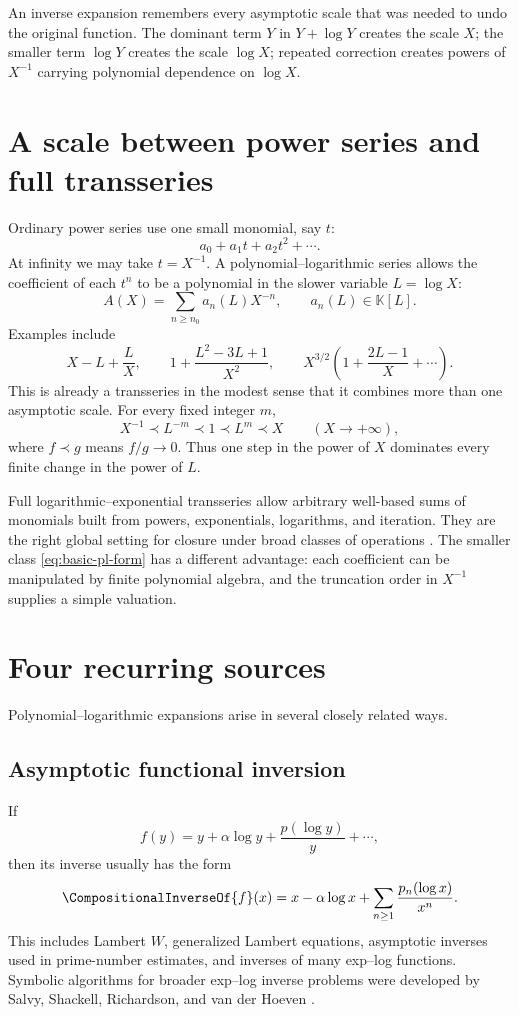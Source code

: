 \documentclass[11pt,openany]{book}
\theoremstyle{definition}
\theoremstyle{plain}
\theoremstyle{remark}
\newcommand{\K}{\mathbb{K}}
\newcommand{\rev}[1]{\CompositionalInverseOf{#1}}
\begin{document}
\begin{intuitionbox}
An inverse expansion remembers every asymptotic scale that was needed to undo
the original function.  The dominant term \(Y\) in \(Y+\log Y\) creates the
scale \(X\); the smaller term \(\log Y\) creates the scale \(\log X\); repeated
correction creates powers of \(X^{-1}\) carrying polynomial dependence on
\(\log X\).
\end{intuitionbox}

\section{A scale between power series and full transseries}
Ordinary power series use one small monomial, say \(t\):
\[
 a_0+a_1t+a_2t^2+\cdots.
\]
At infinity we may take \(t=X^{-1}\).  A polynomial--logarithmic series allows
the coefficient of each \(t^n\) to be a polynomial in the slower variable
\(L=\log X\):
\begin{equation}\label{eq:basic-pl-form}
 A(X)=\sum_{n\ge n_0}a_n(L)X^{-n},
 \qquad a_n(L)\in\K[L].
\end{equation}
Examples include
\[
 X-L+\frac{L}{X},\qquad
 1+\frac{L^2-3L+1}{X^2},\qquad
 X^{3/2}\left(1+\frac{2L-1}{X}+\cdots\right).
\]
This is already a transseries in the modest sense that it combines more than
one asymptotic scale.  For every fixed integer \(m\),
\[
 X^{-1}\prec L^{-m}\prec 1\prec L^m\prec X
 \qquad (X\to+\infty),
\]
where \(f\prec g\) means \(f/g\to0\).  Thus one step in the power of \(X\)
dominates every finite change in the power of \(L\).

Full logarithmic--exponential transseries allow arbitrary well-based sums of
monomials built from powers, exponentials, logarithms, and iteration.  They are
the right global setting for closure under broad classes of operations
\cite{edgar-beginners,edgar-composition,vdhoeven-book,adh-book}.  The smaller
class \eqref{eq:basic-pl-form} has a different advantage: each coefficient can
be manipulated by finite polynomial algebra, and the truncation order in
\(X^{-1}\) supplies a simple valuation.

\section{Four recurring sources}
Polynomial--logarithmic expansions arise in several closely related ways.

\subsection{Asymptotic functional inversion}
If
\[
 f(y)=y+\alpha\log y+\frac{p(\log y)}{y}+\cdots,
\]
then its inverse usually has the form
\[
 \rev{f}(x)=x-\alpha\log x
 +\sum_{n\ge1}\frac{p_n(\log x)}{x^n}.
\]
This includes Lambert \(W\), generalized Lambert equations, asymptotic
inverses used in prime-number estimates, and inverses of many exp--log
functions.  Symbolic algorithms for broader exp--log inverse problems were
developed by Salvy, Shackell, Richardson, and van der Hoeven
\cite{salvy-fast,salvy-shackell,rssv-exp-log}.
\end{document}
